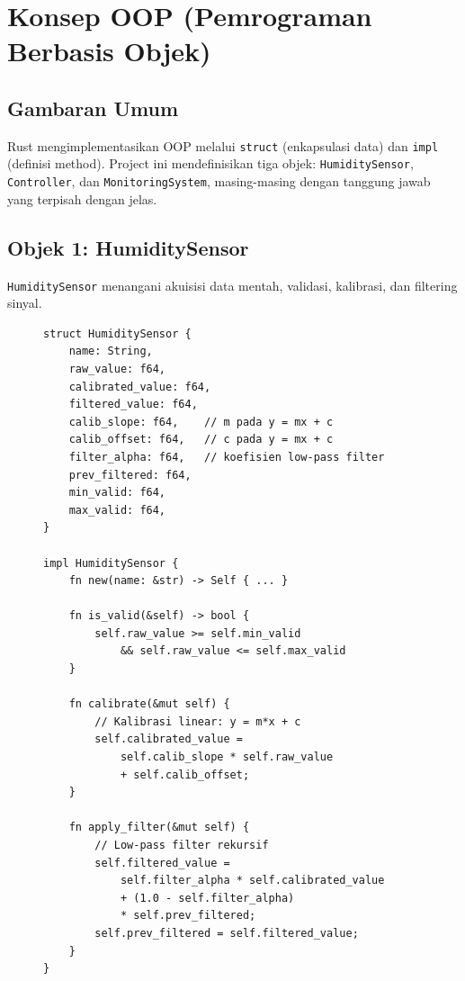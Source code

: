 \documentclass[journal]{IEEEtran}
\begin{document}
\section{Konsep OOP (Pemrograman Berbasis Objek)}

\subsection{Gambaran Umum}
Rust mengimplementasikan OOP melalui \texttt{struct} (enkapsulasi data) dan \texttt{impl} (definisi method). Project ini mendefinisikan tiga objek: \texttt{HumiditySensor}, \texttt{Controller}, dan \texttt{MonitoringSystem}, masing-masing dengan tanggung jawab yang terpisah dengan jelas.

\subsection{Objek 1: HumiditySensor}
\texttt{HumiditySensor} menangani akuisisi data mentah, validasi, kalibrasi, dan filtering sinyal.

\begin{figure}[H]
\begin{lstlisting}[caption={Struct dan Method Utama HumiditySensor}]
struct HumiditySensor {
    name: String,
    raw_value: f64,
    calibrated_value: f64,
    filtered_value: f64,
    calib_slope: f64,    // m pada y = mx + c
    calib_offset: f64,   // c pada y = mx + c
    filter_alpha: f64,   // koefisien low-pass filter
    prev_filtered: f64,
    min_valid: f64,
    max_valid: f64,
}

impl HumiditySensor {
    fn new(name: &str) -> Self { ... }

    fn is_valid(&self) -> bool {
        self.raw_value >= self.min_valid
            && self.raw_value <= self.max_valid
    }

    fn calibrate(&mut self) {
        // Kalibrasi linear: y = m*x + c
        self.calibrated_value =
            self.calib_slope * self.raw_value
            + self.calib_offset;
    }

    fn apply_filter(&mut self) {
        // Low-pass filter rekursif
        self.filtered_value =
            self.filter_alpha * self.calibrated_value
            + (1.0 - self.filter_alpha)
            * self.prev_filtered;
        self.prev_filtered = self.filtered_value;
    }
}
\end{lstlisting}
\end{figure}
\end{document}
